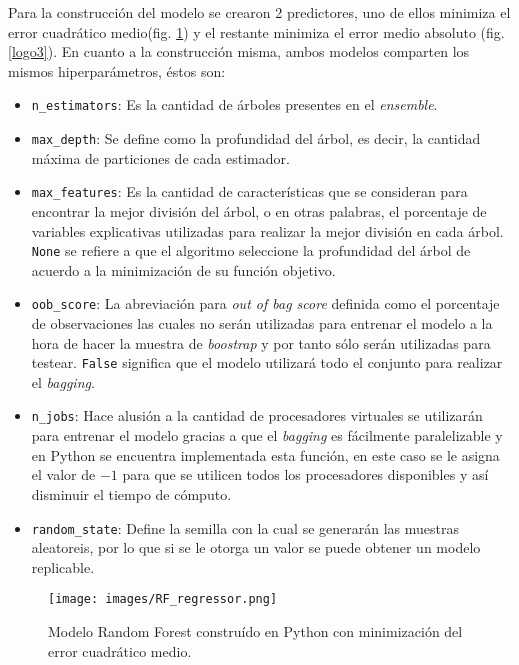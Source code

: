 Para la construcción del modelo se crearon 2 predictores, uno de ellos minimiza el error cuadrático medio(fig. \ref{logo2}) y el restante minimiza el error medio absoluto (fig. \ref{logo3}). En cuanto a la construcción misma, ambos modelos comparten los mismos hiperparámetros, 
éstos son:
\begin{itemize}
    \item \texttt{n\_estimators}: Es la cantidad de árboles presentes en el \textit{ensemble}. 
    \item \texttt{max\_depth}: Se define como la profundidad del árbol, es decir, la cantidad máxima de particiones de cada estimador.
    \item \texttt{max\_features}: Es la cantidad de características que se consideran para encontrar la mejor división del árbol, o en otras palabras, el porcentaje de variables explicativas utilizadas para realizar la mejor división en cada árbol. \texttt{None} 
    se refiere a que el algoritmo seleccione la profundidad del árbol de acuerdo a la minimización de su función objetivo.
    \item \texttt{oob\_score}: La abreviación para \textit{out of bag score} definida como el porcentaje de observaciones las cuales no serán utilizadas para entrenar el modelo a la hora de hacer la muestra de \textit{boostrap} y por tanto sólo serán utilizadas para testear.
    \texttt{False} significa que el modelo utilizará todo el conjunto para realizar el \textit{bagging}.
    \item \texttt{n\_jobs}: Hace alusión a la cantidad de procesadores virtuales se utilizarán para entrenar el modelo gracias a que el \textit{bagging} es fácilmente paralelizable y en Python se encuentra implementada esta función, en este caso se le asigna el valor de  
    $-1$ para que se utilicen todos los procesadores disponibles y así disminuir el tiempo de cómputo.
    \item \texttt{random\_state}: Define la semilla con la cual se generarán las muestras aleatoreis, por lo que si se le otorga un valor se puede obtener un modelo replicable.
\end{itemize}

\begin{figure}[H]
    \centering
          \texttt{[image: images/RF\_regressor.png]}
          \vskip -0.1in
    \caption[Construcción y entrenamiento del modelo Random Forest con criterio de \textit{mse}]{\footnotesize Modelo Random Forest construído en Python con minimización del error cuadrático medio.}
    \label{logo2}
\end{figure}

